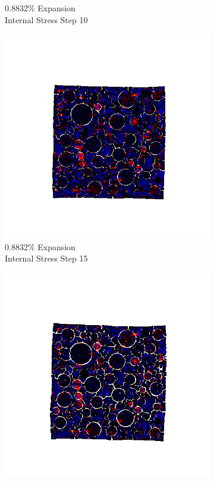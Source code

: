 \begin{figure}[ht!]
\begin{subfigure}{.25\textwidth}
      \caption{0.8832\% Expansion\\Internal Stress Step 10}
    \end{subfigure}%
    \begin{subfigure}{.25\textwidth}
      \centering
      \includegraphics[width=1.0\linewidth]{Files/exp_3D/ASR/A30P75_4_s15.png}
      \caption{0.8832\% Expansion\\Internal Stress Step 15}
    \end{subfigure}%
    \begin{subfigure}{.25\textwidth}
      \centering
      \includegraphics[width=1.0\linewidth]{Files/exp_3D/ASR/A30P75_4_stress.png}

\end{subfigure}
\end{figure}
